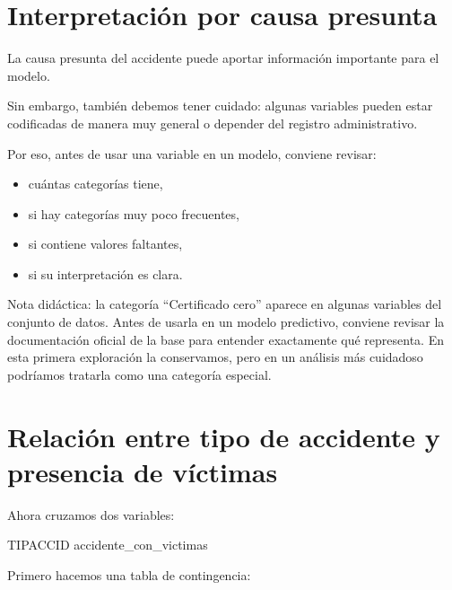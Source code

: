 \documentclass[
  11pt,
  letterpaper,
]{book}
\newenvironment{Shaded}{\begin{snugshade}}{\end{snugshade}}
\newcommand{\AttributeTok}[1]{\textcolor[rgb]{0.40,0.45,0.13}{#1}}
\newcommand{\ControlFlowTok}[1]{\textcolor[rgb]{0.00,0.23,0.31}{\textbf{#1}}}
\newcommand{\FunctionTok}[1]{\textcolor[rgb]{0.28,0.35,0.67}{#1}}
\newcommand{\NormalTok}[1]{\textcolor[rgb]{0.00,0.23,0.31}{#1}}
\newcommand{\OtherTok}[1]{\textcolor[rgb]{0.00,0.23,0.31}{#1}}
\newcommand{\SpecialCharTok}[1]{\textcolor[rgb]{0.37,0.37,0.37}{#1}}
\providecommand{\tightlist}{%
  \setlength{\itemsep}{0pt}\setlength{\parskip}{0pt}}
\begin{document}
\section{Interpretación por causa
presunta}\label{interpretaciuxf3n-por-causa-presunta}

La causa presunta del accidente puede aportar información importante
para el modelo.

Sin embargo, también debemos tener cuidado: algunas variables pueden
estar codificadas de manera muy general o depender del registro
administrativo.

Por eso, antes de usar una variable en un modelo, conviene revisar:

\begin{itemize}
\tightlist
\item
  cuántas categorías tiene,
\item
  si hay categorías muy poco frecuentes,
\item
  si contiene valores faltantes,
\item
  si su interpretación es clara.
\end{itemize}

Nota didáctica: la categoría ``Certificado cero'' aparece en algunas
variables del conjunto de datos. Antes de usarla en un modelo
predictivo, conviene revisar la documentación oficial de la base para
entender exactamente qué representa. En esta primera exploración la
conservamos, pero en un análisis más cuidadoso podríamos tratarla como
una categoría especial.

\section{Relación entre tipo de accidente y presencia de
víctimas}\label{relaciuxf3n-entre-tipo-de-accidente-y-presencia-de-vuxedctimas}

Ahora cruzamos dos variables:

\begin{Shaded}
\begin{Highlighting}[]
\NormalTok{TIPACCID}
\NormalTok{accidente\_con\_victimas}
\end{Highlighting}
\end{Shaded}

Primero hacemos una tabla de contingencia:

\begin{Shaded}
\end{Shaded}
\end{document}
